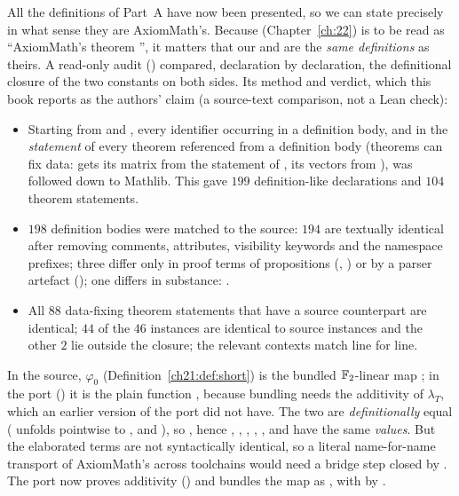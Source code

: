 All the definitions of Part~A have now been presented, so we can state precisely in what sense they are
AxiomMath's.  Because  (Chapter~\ref{ch:22}) is to be read as ``AxiomMath's theorem
'', it matters that our  and  are the \emph{same
definitions} as theirs.  A read-only audit
() compared, declaration by
declaration, the definitional closure of the two constants on both sides.  Its method and verdict, which
this book reports as the authors' claim (a source-text comparison, not a Lean check):
\begin{itemize}
\item Starting from  and , every identifier occurring in a definition body, and in
  the \emph{statement} of every theorem referenced from a definition body (theorems can fix data: 
  gets its matrix from the statement of ,  its vectors from
  ), was followed down to Mathlib.  This gave $199$ definition-like
  declarations and $104$ theorem statements.
\item $198$ definition bodies were matched to the source: $194$ are textually identical after removing
  comments, attributes, visibility keywords and the namespace prefixes; three differ only in proof terms
  of propositions (, ) or by a parser artefact (); one differs in
  substance: .
\item All $88$ data-fixing theorem statements that have a source counterpart are identical; $44$ of the
  $46$ instances are identical to source instances and the other $2$ lie outside the closure; the relevant
   contexts match line for line.
\end{itemize}

\begin{warning}[title={The one substantive difference: \texttt{phi0} is a function, not a bundled linear map}]
In the source, $\varphi_0$ (Definition~\ref{ch21:def:short}) is the bundled $\mathbb{F}_2$-linear map
; in the port
() it is the plain
function , because bundling needs the additivity of
$\lambda_T$, which an earlier version of the port did not have.  The two are \emph{definitionally}
equal ( unfolds pointwise to , and
), so , hence , ,
, , ,  and  have the same \emph{values}.  But the
elaborated terms are not syntactically identical, so a literal name-for-name transport of AxiomMath's
 across toolchains would need a bridge step closed by .  The port now
proves additivity () and bundles the map as , with
 by .
\end{warning}

